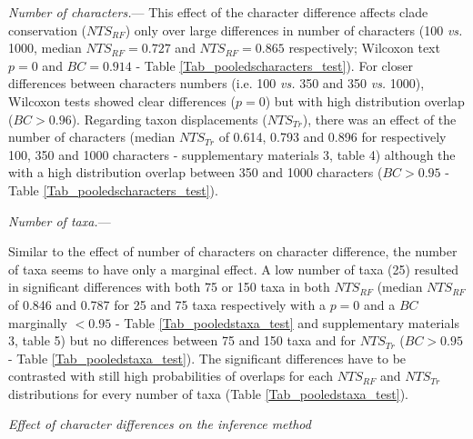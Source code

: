 \documentclass[12pt,letterpaper]{article}
\renewcommand{\subsection}[1]{%
\bigskip
\begin{center}
\begin{large}
\normalfont\itshape #1
\end{large}
\end{center}}
\renewcommand{\subsubsection}[1]{%
\vspace{2ex}
\noindent
\textit{#1.}---}
\begin{document}


\subsubsection{Number of characters}
This effect of the character difference affects clade conservation ($NTS_{RF}$) only over large differences in number of characters (100 \textit{vs.} 1000, median $NTS_{RF} = 0.727$ and $NTS_{RF} = 0.865$ respectively; Wilcoxon text $p = 0$ and $BC = 0.914$ - Table \ref{Tab_pooledscharacters_test}).
For closer differences between characters numbers (i.e. 100 \textit{vs.} 350 and 350 \textit{vs.} 1000), Wilcoxon tests showed clear differences ($p = 0$) but with high distribution overlap ($BC > 0.96$).
Regarding taxon displacements ($NTS_{Tr}$), there was an effect of the number of characters (median $NTS_{Tr}$ of 0.614, 0.793 and 0.896 for respectively 100, 350 and 1000 characters - supplementary materials 3, table 4) although the with a high distribution overlap between 350 and 1000 characters ($BC > 0.95$ - Table \ref{Tab_pooledscharacters_test}).




\subsubsection{Number of taxa}

Similar to the effect of number of characters on character difference, the number of taxa seems to have only a marginal effect.
A low number of taxa (25) resulted in significant differences with both 75 or 150 taxa in both $NTS_{RF}$ (median $NTS_{RF}$ of 0.846 and 0.787 for 25 and 75 taxa respectively with a $p = 0$ and a $BC$ marginally $< 0.95$ - Table \ref{Tab_pooledstaxa_test} and supplementary materials 3, table 5) but no differences between 75 and 150 taxa and for $NTS_{Tr}$ ($BC > 0.95$ - Table \ref{Tab_pooledstaxa_test}).
The significant differences have to be contrasted with still high probabilities of overlaps for each $NTS_{RF}$ and $NTS_{Tr}$ distributions for every number of taxa (Table \ref{Tab_pooledstaxa_test}).



\subsection{Effect of character differences on the inference method}
\end{document}
